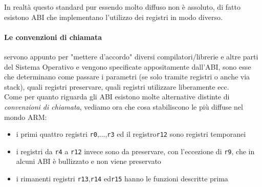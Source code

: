 \documentclass[class=book, crop=false]{standalone}
\begin{document}
In realtà questo standard pur essendo molto diffuso non è assoluto, di fatto esistono ABI che implementano l'utilizzo dei registri in modo diverso.\\

\paragraph{Le convenzioni di chiamata} servono appunto per "mettere d'accordo" diversi compilatori/librerie e altre parti del Sistema Operativo e vengono specificate appositamente dall'ABI, sono esse che determinano come passare i parametri (se solo tramite registri o anche via stack), quali registri preservare, quali registri utilizzare liberamente ecc.\\
Come per quanto riguarda gli ABI esistono molte alternative distinte di \emph{convenzioni di chiamata}, vediamo ora che cosa stabiliscono le più diffuse nel mondo ARM:

\begin{itemize}[nolistsep]
	\item i primi quattro registri \texttt{r0},...,\texttt{r3} ed il registro\texttt{r12} sono registri temporanei
	\item i registri da \texttt{r4} a \texttt{r12} invece sono da preservare, con l'eccezione di \texttt{r9}, che in alcuni ABI è bullizzato e non viene preservato
	\item i rimanenti registri \texttt{r13},\texttt{r14} ed\texttt{r15} hanno le funzioni descritte prima
\end{itemize}
\end{document}
